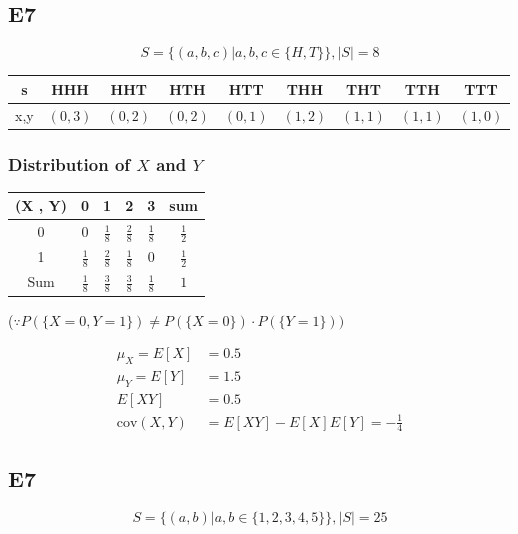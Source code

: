 \documentclass[12pt, a4paper]{article}
\begin{document}
\subsection* {E7}
$$
S = \{ (a,b,c) | a,b,c \in \{ H, T \} \} , |S| = 8
$$
\begin{table}[h]
\centering
\begin{tabular}{|c|c|c|c|c|c|c|c|c|}
\hline
s & HHH & HHT & HTH & HTT & THH & THT & TTH & TTT \\
\hline
x,y & $ (0,3) $ & $(0,2)$ & $(0,2)$ & $(0,1)$ & $(1,2)$ & $(1,1)$ & $(1,1)$ & $(1,0)$ \\
\hline
\end{tabular}
\end{table}

\subsubsection*{Distribution of $X$ and $Y$}
\begin{table}[h]
\centering
\begin{tabular}{|c|c|c|c|c|c|}
\hline
(X , Y) & 0 & 1 & 2 & 3 & sum  \\
\hline
0 & $ 0 $ & $\frac{1}{8}$ & $\frac{2}{8}$ & $\frac{1}{8}$ & $\frac{1}{2}$ \\
1 & $\frac{1}{8}$ & $\frac{2}{8}$ & $\frac{1}{8}$ & $0$ & $\frac{1}{2}$ \\
\hline
Sum & $\frac{1}{8}$ & $\frac{3}{8}$ & $\frac{3}{8}$ & $\frac{1}{8}$ & $1$ \\
\hline
\end{tabular}
\end{table}


($\because P( \{ X = 0, Y = 1 \} ) \neq P( \{X = 0 \} ) \cdot P( \{ Y = 1 \} ) )$

\begin{align*}
\mu_X = E[X] &= 0.5 \\
\mu_Y = E[Y] &= 1.5 \\
E[XY] &= 0.5 \\
\text{cov}(X,Y) &=  E[XY] - E[X]E[Y] = - \frac{1}{4}
\end{align*}

\subsection* {E7}
$$
S = \{ (a,b) | a,b \in \{ 1, 2, 3, 4, 5 \} \} , |S| = 25
$$
\end{document}
